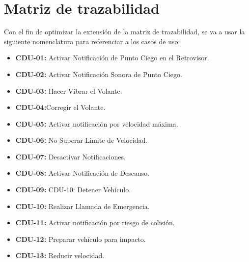 \section{Matriz de trazabilidad}\label{sec:matrizTraz}
\par Con el fin de optimizar la extensión de la matriz de trazabilidad, se va a usar la siguiente nomenclatura para referenciar a los casos de uso:

\begin{itemize}[-]
\item \textbf{CDU-01:} Activar Notificación de Punto Ciego en el Retrovisor.
\item \textbf{CDU-02:} Activar Notificación Sonora de Punto Ciego.
\item \textbf{CDU-03:} Hacer Vibrar el Volante.
\item \textbf{CDU-04:}Corregir el Volante.
\item \textbf{CDU-05:} Activar notificación por velocidad máxima.
\item \textbf{CDU-06:} No Superar Límite de Velocidad.
\item \textbf{CDU-07:} Desactivar Notificaciones.
\item \textbf{CDU-08:} Activar Notificación de Descanso.
\item \textbf{CDU-09:} CDU-10: Detener Vehículo.
\item \textbf{CDU-10:} Realizar Llamada de Emergencia.
\item \textbf{CDU-11:} Activar notificación por riesgo de colisión.
\item \textbf{CDU-12:} Preparar vehículo para impacto.
\item \textbf{CDU-13:} Reducir velocidad.
\end{itemize}

